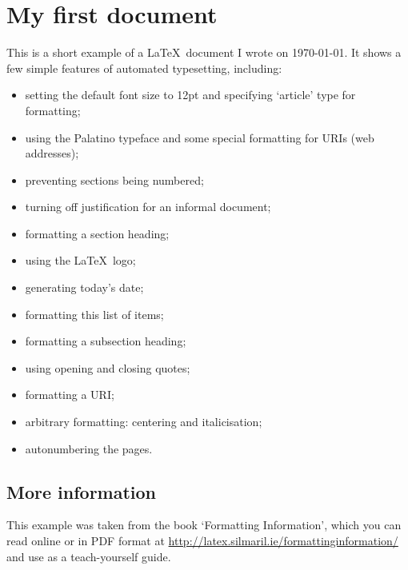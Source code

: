 \documentclass[12pt]{article}
\begin{document}
	
	\section{My first document}
	
	This is a short example of a \LaTeX\ document I wrote on \today. It
	shows a few simple features of automated typesetting, including:
	
	\begin{itemize}
		\item setting the default font size to 12pt and specifying `article'
		type for formatting;
		\item using the Palatino typeface and some special formatting for
		URIs (web addresses);
		\item preventing sections being numbered;
		\item turning off justification for an informal document;
		\item formatting a section heading;
		\item using the \LaTeX\ logo;
		\item generating today's date;
		\item formatting this list of items;
		\item formatting a subsection heading;
		\item using opening and closing quotes;
		\item formatting a URI;
		\item arbitrary formatting: centering and italicisation;
		\item autonumbering the pages.
	\end{itemize}
	
	\subsection{More information}
	
	This example was taken from the book `Formatting Information',
	which you can read online or in PDF format at
	\url{http://latex.silmaril.ie/formattinginformation/} and use as a
	teach-yourself guide.
	
	\begin{center}
	\end{center}
	
\end{document}
